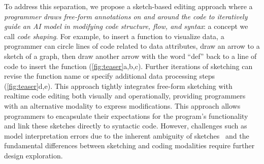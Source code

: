 To address this separation, we propose a sketch-based editing approach where a \textit{programmer draws free-form annotations on and around the code to iteratively guide an AI model in modifying code structure, flow, and syntax}: a concept we call \textit{code shaping}. For example, to insert a function to visualize data, a programmer can circle lines of code related to data attributes, draw an arrow to a sketch of a graph, then draw another arrow with the word ``def'' back to a line of code to insert the function (\autoref{fig:teaser}a,b,c). Further iterations of sketching can revise the function name or specify additional data processing steps (\autoref{fig:teaser}d,e). This approach tightly integrates free-form sketching with realtime code editing both visually and operationally, providing programmers with an alternative modality to express modifications.
This approach allows programmers to encapsulate their expectations for the program's functionality and link these sketches directly to syntactic code. However, challenges such as model interpretation errors due to the inherent ambiguity of sketches~\cite{10.1145/1281500.1281527, 10.1145/237091.237119} and the fundamental differences between sketching and coding modalities require further design exploration.

